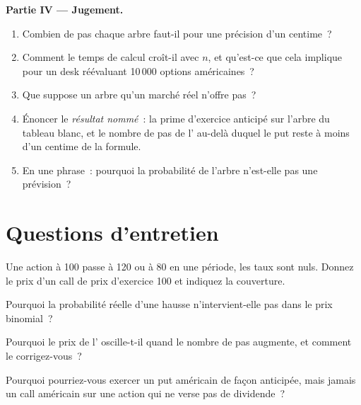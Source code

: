 \begin{problem}
\medskip\noindent\textbf{Partie IV --- Jugement.}
\begin{enumerate}[resume]
\item Combien de pas chaque arbre faut-il pour une précision d'un centime~?
\item Comment le temps de calcul croît-il avec $n$, et qu'est-ce que cela implique pour un desk
réévaluant 10\,000 options américaines~?
\item Que suppose un arbre qu'un marché réel n'offre pas~?
\item Énoncer le \emph{résultat nommé}~: la prime d'exercice anticipé sur l'arbre
du tableau blanc, et le nombre de pas de l' au-delà duquel le put reste
à moins d'un centime de la formule.
\item En une phrase~: pourquoi la probabilité de l'arbre n'est-elle pas une prévision~?
\end{enumerate}
\end{problem}

\section{Questions d'entretien}

\begin{interviewq}\label{iq:dv:the-binomial-model:1}
Une action à 100 passe à 120 ou à 80 en une période, les taux sont nuls. Donnez le prix d'un call
de prix d'exercice 100 et indiquez la couverture.
\end{interviewq}

\begin{interviewq}\label{iq:dv:the-binomial-model:2}
Pourquoi la probabilité réelle d'une hausse n'intervient-elle pas dans le prix binomial~?
\end{interviewq}

\begin{interviewq}\label{iq:dv:the-binomial-model:3}
Pourquoi le prix de l' oscille-t-il quand le nombre de pas augmente,
et comment le corrigez-vous~?
\end{interviewq}

\begin{interviewq}\label{iq:dv:the-binomial-model:4}
Pourquoi pourriez-vous exercer un put américain de façon anticipée, mais jamais un call américain sur
une action qui ne verse pas de dividende~?
\end{interviewq}

